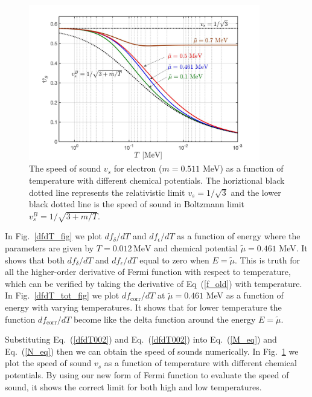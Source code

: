 \documentclass[sn-mathphys,Numbered]{sn-jnl}
\theoremstyle{thmstyleone}%
\theoremstyle{thmstyletwo}%
\theoremstyle{thmstylethree}%
\begin{document}
\begin{figure}[h]
\begin{center}
\includegraphics[width=0.9\textwidth]{./plot/SoundSpeed002}
\caption{
The speed of sound $v_s$ for electron ($m=0.511$ MeV) as a function of temperature with different chemical potentials. The horiztional black dotted line represents the relativistic limit $v_s=1/\sqrt{3}$ and the lower black dotted line is the speed of sound in Boltzmann limit $v_s^B=1/\sqrt{3+m/T}$.}
\label{SoundSpeed_fig}
\end{center}
\end{figure}

In Fig.~\ref{dfdT_fig} we plot $df_\delta/dT$ and $df_\epsilon/dT$ as a function of energy where the parameters are given by $T=0.012\,\mathrm{MeV}$ and chemical potential $\tilde\mu=0.461$ MeV. It shows that both $df_\delta/dT$ and $df_\epsilon/dT$ equal to zero when $E=\tilde\mu$. This is truth for all the higher-order derivative of Fermi function with respect to temperature, which can be verified by taking the derivative of Eq~(\ref{f_old}) with temperature. In Fig.~\ref{dfdT_tot_fig} we plot $df_\mathrm{corr}/dT$ at $\tilde\mu=0.461$ MeV as a function of energy with varying temperatures. It shows that for lower temperature the function $df_\mathrm{corr}/dT$ become like the delta function around the energy $E=\tilde\mu$.

Substituting Eq.~(\ref{dfdT002}) and Eq.~(\ref{dfdT002}) into Eq.~(\ref{M_eq}) and Eq.~(\ref{N_eq}) then we can obtain the speed of sounds numerically. In Fig.~\ref{SoundSpeed_fig} we plot the speed of sound $v_s$ as a function of temperature with different chemical potentials. By using our new form of Fermi function to evaluate the speed of sound, it shows the correct limit for both high and low temperatures. 
\end{document}
